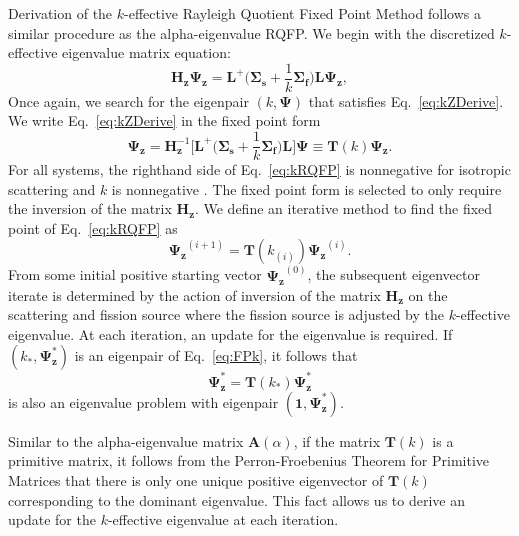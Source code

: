 Derivation of the $k$-effective Rayleigh Quotient Fixed Point Method follows a similar procedure as the alpha-eigenvalue RQFP. We begin with the discretized $k$-effective eigenvalue matrix equation:
\begin{equation}
	\mathbf{H_{z}} \mathbf{\Psi_{z}} = \mathbf{L}^{+} \bigg ( \mathbf{\Sigma_{s}} + \frac{1}{k}\mathbf{\Sigma_{f}} \bigg ) \mathbf{L} \mathbf{\Psi_{z}},
	\label{eq:kZDerive}
\end{equation}
Once again, we search for the eigenpair $(k, \mathbf{\Psi})$ that satisfies Eq.~\ref{eq:kZDerive}. We write Eq.~\ref{eq:kZDerive} in the fixed point form
\begin{equation}
	\mathbf{\Psi_{z}} = \mathbf{H}^{-1}_{\mathbf{z}} \bigg [ \mathbf{L}^{+} \bigg ( \mathbf{\Sigma_{s}} + \frac{1}{k} \mathbf{\Sigma_{f}} \bigg ) \mathbf{L} \bigg ] \mathbf{\Psi} \equiv \mathbf{T}(k) \mathbf{\Psi_{z}}.
	\label{eq:kRQFP}
\end{equation}
For all systems, the righthand side of Eq.~\ref{eq:kRQFP} is nonnegative for isotropic scattering and $k$ is nonnegative \cite{warsa_krylov_2004}. The fixed point form is selected to only require the inversion of the matrix $\mathbf{H}_{\mathbf{z}}$.
We define an iterative method to find the fixed point of Eq.~\ref{eq:kRQFP} as
\begin{equation}
	\mathbf{\Psi_{z}}^{(i+1)} = \mathbf{T}(k_{(i)}) \mathbf{\Psi_{z}}^{(i)}.
	\label{eq:FPk}
\end{equation}
From some initial positive starting vector $\mathbf{\Psi_{z}}^{(0)}$, the subsequent eigenvector iterate is determined by the action of inversion of the matrix $\mathbf{H_{z}}$ on the scattering and fission source where the fission source is adjusted by the $k$-effective eigenvalue. At each iteration, an update for the eigenvalue is required. If $(k_{*},\mathbf{\Psi}_\mathbf{z}^{*})$ is an eigenpair of Eq.~\ref{eq:FPk}, it follows that
\begin{equation}
	\mathbf{\Psi}_\mathbf{z}^{*} = \mathbf{T}(k_{*}) \mathbf{\Psi}_\mathbf{z}^{*}
\end{equation}
is also an eigenvalue problem with eigenpair $(\mathbf{1},\mathbf{\Psi}_\mathbf{z}^{*})$.

Similar to the alpha-eigenvalue matrix $\mathbf{A}(\alpha)$, if the matrix $\mathbf{T}(k)$ is a primitive matrix, it follows from the Perron-Froebenius Theorem for Primitive Matrices that there is only one unique positive eigenvector of $\mathbf{T}(k)$ corresponding to the dominant eigenvalue. This fact allows us to derive an update for the $k$-effective eigenvalue at each iteration.

